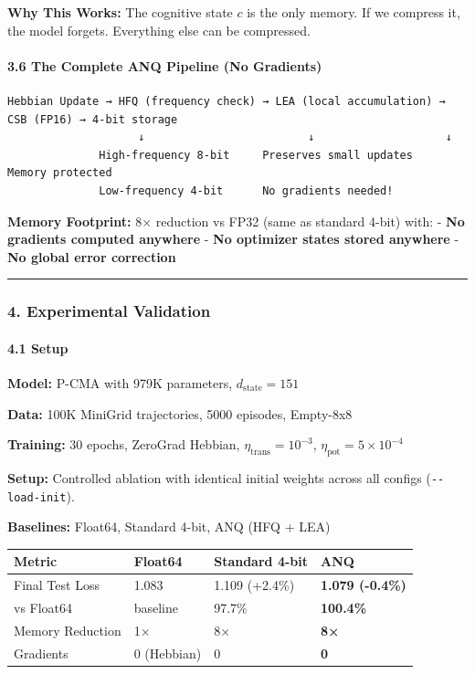 \documentclass[
  11pt,
  a4paper,
]{article}
\begin{document}
\textbf{Why This Works:} The cognitive state \(c\) is the only memory.
If we compress it, the model forgets. Everything else can be compressed.

\paragraph{3.6 The Complete ANQ Pipeline (No
Gradients)}\label{the-complete-anq-pipeline-no-gradients}

\begin{verbatim}
Hebbian Update → HFQ (frequency check) → LEA (local accumulation) → CSB (FP16) → 4-bit storage
                    ↓                         ↓                    ↓
              High-frequency 8-bit     Preserves small updates   Memory protected
              Low-frequency 4-bit      No gradients needed!
\end{verbatim}

\textbf{Memory Footprint:} 8× reduction vs FP32 (same as standard 4-bit)
with: - \textbf{No gradients computed anywhere} - \textbf{No optimizer
states stored anywhere} - \textbf{No global error correction}

\begin{center}\rule{0.5\linewidth}{0.5pt}\end{center}

\subsubsection{4. Experimental
Validation}\label{experimental-validation}

\paragraph{4.1 Setup}\label{setup}

\textbf{Model:} P-CMA with 979K parameters, \(d_{\text{state}} = 151\)

\textbf{Data:} 100K MiniGrid trajectories, 5000 episodes, Empty-8x8

\textbf{Training:} 30 epochs, ZeroGrad Hebbian,
\(\eta_{\text{trans}} = 10^{-3}\),
\(\eta_{\text{pot}} = 5 \times 10^{-4}\)

\textbf{Setup:} Controlled ablation with identical initial weights
across all configs (\texttt{-\/-load-init}).

\textbf{Baselines:} Float64, Standard 4-bit, ANQ (HFQ + LEA)

\begin{longtable}[]{@{}llll@{}}
\toprule\noalign{}
Metric & Float64 & Standard 4-bit & \textbf{ANQ} \\
\midrule\noalign{}
\endhead
\bottomrule\noalign{}
\endlastfoot
Final Test Loss & 1.083 & 1.109 (+2.4\%) & \textbf{1.079 (-0.4\%)} \\
vs Float64 & baseline & 97.7\% & \textbf{100.4\%} \\
Memory Reduction & 1× & 8× & \textbf{8×} \\
Gradients & 0 (Hebbian) & 0 & \textbf{0} \\
\end{longtable}
\end{document}
